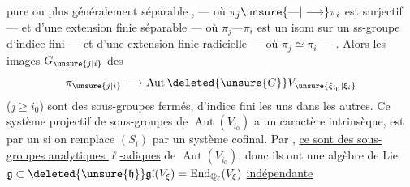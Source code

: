 pure ou plus généralement séparable , --- où $\pi_j\unsure{\text{---}|\longrightarrow}\pi_i$ est surjectif --- et d'une extension finie séparable --- où $\pi_j\text{---}\pi_i$ est un isom sur un ss-groupe d'indice fini --- et d'une extension finie radicielle --- où $\pi_j\simeq\pi_i$ --- . Alors les images $G_{\unsure{j|i}}$ des
\[
\pi_{\unsure{j|i}}\longrightarrow\operatorname{Aut}\deleted{\unsure{G}}V_{\unsure{\xi_{i_0}|\xi_i}}
\]
($j\geq i_0$) sont des sous-groupes fermés,  d'indice fini les uns dans les autres. Ce système projectif de sous-groupes de $\operatorname{Aut}(V_{i_0})$  a un caractère intrinsèque, est  par un  si on remplace $(S_i)$ par un système cofinal. Par , \uline{ce sont des sous-groupes analytiques $\ell$-adiques} de $\operatorname{Aut}(V_{i_0})$, donc ils ont une algèbre de Lie $\mathfrak g\subset\deleted{\unsure{\mathfrak h}}\mathfrak{gl}(V_\xi)=\operatorname{End}_{\mathbb Q_\ell}(V_\xi)$ \uline{indépendante}
